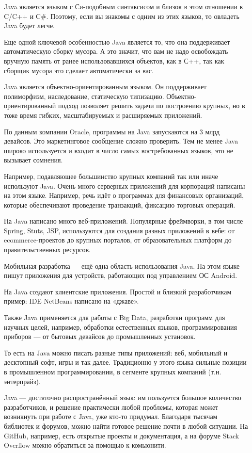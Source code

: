 Java является языком с Си-подобным синтаксисом и близок в этом отношении к C/C++ и C\#. Поэтому, если вы знакомы с одним из этих языков, то овладеть Java будет легче.

Еще одной ключевой особенностью Java является то, что она поддерживает автоматическую сборку мусора. А это значит, что вам не надо освобождать вручную память от ранее использовавшихся объектов, как в С++, так как сборщик мусора это сделает автоматически за вас.

Java является объектно-ориентированным языком. Он поддерживает полиморфизм, наследование, статическую типизацию. Объектно-ориентированный подход позволяет решить задачи по построению крупных, но в тоже время гибких, масштабируемых и расширяемых приложений.

По данным компании Oracle, программы на Java запускаются на 3 млрд девайсов. Это маркетинговое сообщение сложно проверить. Тем не менее Java широко используется и входит в число самых востребованных языков, это не вызывает сомнения.

Например, подавляющее большинство крупных компаний так или иначе используют Java. Очень много серверных приложений для корпораций написаны на этом языке. Например, речь идёт о программах для финансовых организаций, которые обеспечивают проведение транзакций, фиксацию торговых операций.

На Java написано много веб-приложений. Популярные фреймворки, в том числе Spring, Stuts, JSP, используются для создания разных приложений в вебе: от ecommerce-проектов до крупных порталов, от образовательных платформ до правительственных ресурсов.

Мобильная разработка — ещё одна область использования Java. На этом языке пишут приложения для устройств, работающих под управлением ОС Android.

На Java создают клиентские приложения. Простой и близкий разработчикам пример: IDE NetBeans написано на «джаве».

Также Java применяется для работы с Big Data, разработки программ для научных целей, например, обработки естественных языков, программирования приборов — от бытовых девайсов до промышленных установок.

То есть на Java можно писать разные типы приложений: веб, мобильный и десктопный софт, игры и так далее. Традиционно у этого языка сильные позиции в промышленном программировании, в сегменте крупных компаний (т.н. энтерпрайз).

Java — достаточно распространённый язык: им пользуется большое количество разработчиков, и решение практически любой проблемы, которая может возникнуть при работе с Java, уже кто-то придумал. Благодаря тысячам библиотек и форумов, можно найти готовое решение почти в любой ситуации. На GitHub, например, есть открытые проекты и документация, а на форуме Stack Overflow можно обратиться за помощью к комьюнити.

